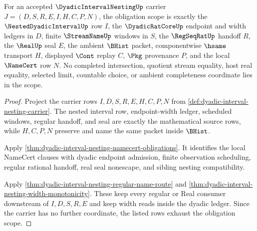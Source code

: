 \begin{theorem}\label{thm:dyadic-interval-nesting-obligation-scope}
For an accepted $\DyadicIntervalNestingUp$ carrier $J=(D,S,R,E,I,H,C,P,N)$, the obligation scope is exactly the $\NestedDyadicIntervalUp$ row $I$, the $\DyadicRatCoreUp$ endpoint and width ledgers in $D$, finite $\StreamNameUp$ windows in $S$, the $\RegSeqRatUp$ handoff $R$, the $\RealUp$ seal $E$, the ambient $\BHist$ packet, componentwise $\hsame$ transport $H$, displayed $\Cont$ replay $C$, $\Pkg$ provenance $P$, and the local $\NameCert$ row $N$. No completed intersection, quotient stream equality, host real equality, selected limit, countable choice, or ambient completeness coordinate lies in the scope.
\end{theorem}
\begin{proof}
Project the carrier rows $I,D,S,R,E,H,C,P,N$ from \autoref{def:dyadic-interval-nesting-carrier}. The nested interval row, endpoint-width ledger, scheduled windows, regular handoff, and seal are exactly the mathematical source rows, while $H,C,P,N$ preserve and name the same packet inside $\BHist$.

Apply \autoref{thm:dyadic-interval-nesting-namecert-obligations}. It identifies the local NameCert clauses with dyadic endpoint admission, finite observation scheduling, regular rational handoff, real seal nonescape, and sibling nesting compatibility.

Apply \autoref{thm:dyadic-interval-nesting-regular-name-route} and \autoref{thm:dyadic-interval-nesting-width-monotonicity}. These keep every regular or Real consumer downstream of $I,D,S,R,E$ and keep width reads inside the dyadic ledger. Since the carrier has no further coordinate, the listed rows exhaust the obligation scope.
\end{proof}

